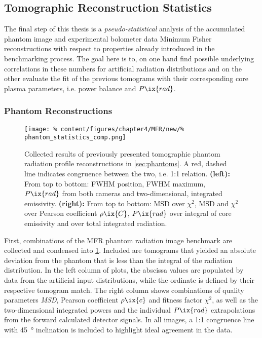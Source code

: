         \subsection{Tomographic Reconstruction Statistics}%
%
            The final step of this thesis is a \textit{pseudo-statistical} analysis of the accumulated phantom image and experimental bolometer data Minimum Fisher reconstructions with respect to properties already introduced in the benchmarking process. The goal here is to, on one hand find possible underlying correlations in these numbers for artificial radiation distributions and on the other evaluate the fit of the previous tomograms with their corresponding core plasma parameters, i.e. power balance and $P\ix{rad}$.%
%
            \subsubsection*{Phantom Reconstructions}%
%
                \begin{figure}[t]%
                    \centering%
                    \texttt{[image: \%
                        content/figures/chapter4/MFR/new/\%
                        phantom\_statistics\_comp.png]}%
                    \caption{%
                        Collected results of previously presented tomographic phantom radiation profile reconstructions in \cref{sec:phantoms}. A red, dashed line indicates congruence between the two, i.e. 1:1 relation. \textbf{(left):} From top to bottom: FWHM position, FWHM maximum, $P\ix{rad}$ from both cameras and two-dimensional, integrated emissivity. \textbf{(right):} From top to bottom: MSD over $\chi^{2}$, MSD and $\chi^{2}$ over Pearson coefficient $\rho\ix{C}$, $P\ix{rad}$ over integral of core emissivity and over total integrated radiation.}\label{fig:tomo_phantom_statistics}%
                \end{figure}%
%
                First, combinations of the MFR phantom radiation image benchmark are collected and condensed into \cref{fig:tomo_phantom_statistics}. Included are tomograms that yielded an absolute deviation from the phantom that is less than the integral of the radiation distribution. In the left column of plots, the abscissa values are populated by data from the artificial input distributions, while the ordinate is defined by their respective tomogram match. The right column shows combinations of quality parameters \textit{MSD}, Pearson coefficient $\rho\ix{c}$ and fitness factor $\chi^{2}$, as well as the two-dimensional integrated powers and the individual $P\ix{rad}$ extrapolations from the forward calculated detector signals. In all images, a 1:1 congruence line with \SI{45}{\degree} inclination is included to highlight ideal agreement in the data.\\%
